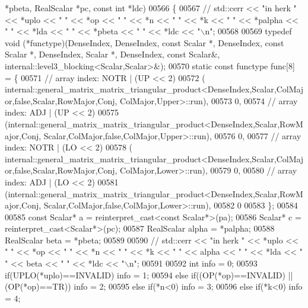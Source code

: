 \begin{DoxyCode}
      *pbeta, RealScalar *pc, \textcolor{keyword}{const} \textcolor{keywordtype}{int} *ldc)
00566 \{
00567 \textcolor{comment}{//   std::cerr << "in herk " << *uplo << " " << *op << " " << *n << " " << *k << " " << *palpha << " " <<
       *lda << " " << *pbeta << " " << *ldc << "\(\backslash\)n";}
00568 
00569   \textcolor{keyword}{typedef} void (*functype)(DenseIndex, DenseIndex, \textcolor{keyword}{const} Scalar *, DenseIndex, \textcolor{keyword}{const} Scalar *, DenseIndex, 
      Scalar *, DenseIndex, \textcolor{keyword}{const} Scalar&, internal::level3\_blocking<Scalar,Scalar>&);
00570   \textcolor{keyword}{static} \textcolor{keyword}{const} functype func[8] = \{
00571     \textcolor{comment}{// array index: NOTR  | (UP << 2)}
00572     (
      internal::general\_matrix\_matrix\_triangular\_product<DenseIndex,Scalar,ColMajor,false,Scalar,RowMajor,Conj, ColMajor,Upper>::run),
00573     0,
00574     \textcolor{comment}{// array index: ADJ   | (UP << 2)}
00575     (internal::general\_matrix\_matrix\_triangular\_product<DenseIndex,Scalar,RowMajor,Conj,
       Scalar,ColMajor,false,ColMajor,Upper>::run),
00576     0,
00577     \textcolor{comment}{// array index: NOTR  | (LO << 2)}
00578     (
      internal::general\_matrix\_matrix\_triangular\_product<DenseIndex,Scalar,ColMajor,false,Scalar,RowMajor,Conj, ColMajor,Lower>::run),
00579     0,
00580     \textcolor{comment}{// array index: ADJ   | (LO << 2)}
00581     (internal::general\_matrix\_matrix\_triangular\_product<DenseIndex,Scalar,RowMajor,Conj,
       Scalar,ColMajor,false,ColMajor,Lower>::run),
00582     0
00583   \};
00584 
00585   \textcolor{keyword}{const} Scalar* a = \textcolor{keyword}{reinterpret\_cast<}\textcolor{keyword}{const }Scalar*\textcolor{keyword}{>}(pa);
00586   Scalar* c = \textcolor{keyword}{reinterpret\_cast<}Scalar*\textcolor{keyword}{>}(pc);
00587   RealScalar alpha = *palpha;
00588   RealScalar beta  = *pbeta;
00589 
00590 \textcolor{comment}{//   std::cerr << "in herk " << *uplo << " " << *op << " " << *n << " " << *k << " " << alpha << " " <<
       *lda << " " << beta << " " << *ldc << "\(\backslash\)n";}
00591 
00592   \textcolor{keywordtype}{int} info = 0;
00593   \textcolor{keywordflow}{if}(UPLO(*uplo)==INVALID)                                            info = 1;
00594   \textcolor{keywordflow}{else} \textcolor{keywordflow}{if}((OP(*op)==INVALID) || (OP(*op)==TR))                        info = 2;
00595   \textcolor{keywordflow}{else} \textcolor{keywordflow}{if}(*n<0)                                                       info = 3;
00596   \textcolor{keywordflow}{else} \textcolor{keywordflow}{if}(*k<0)                                                       info = 4;

\end{DoxyCode}
